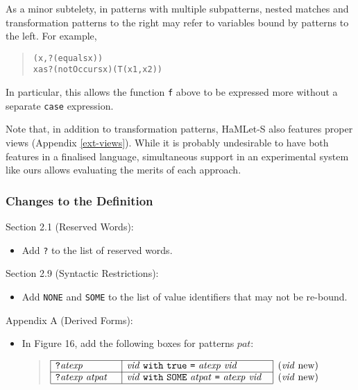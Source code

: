 \documentclass[twoside,titlepage]{article}
\begin{document}
\begin{appendix}
As a minor subtelety, in patterns with multiple subpatterns, nested matches and transformation patterns to the right may refer to variables bound by patterns to the left. For example,
\begin{quote}
\begin{alltt}
(x, ?(equals x))
x as ?(notOccurs x)(T(x1,x2))
\end{alltt}
\end{quote}
In particular, this allows the function {\tt f} above to be expressed more without a separate {\tt case} expression.

Note that, in addition to transformation patterns, HaMLet-S also features proper views (Appendix \ref{ext-views}). While it is probably undesirable to have both features in a finalised language, simultaneous support in an experimental system like ours allows evaluating the merits of each approach.

\subsubsection*{Changes to the Definition}

Section 2.1 (Reserved Words):
\begin{itemize}
\item Add {\tt?} to the list of reserved words.
\end{itemize}

Section 2.9 (Syntactic Restrictions):
\begin{itemize}
\item Add {\tt NONE} and {\tt SOME} to the list of value identifiers that may not be re-bound.
\end{itemize}

Appendix A (Derived Forms):
\begin{itemize}
\item In Figure 16, add the following boxes for patterns $\mathit{pat}$:
  \begin{quote}
  $\begin{array}{|l|l|l}
  \cline{1-2}
  \mbox{\tt?}\mathit{atexp}~~~~\strut
  & \mathit{vid}~{\tt{with}}~{\tt{true}}~\mbox{\tt=}~\mathit{atexp}~\mathit{vid}
  & \mbox{($\mathit{vid}$ new)} \\
  \cline{1-2}
  \mbox{\tt?}\mathit{atexp}~\mathit{atpat}~~~\strut
  & \mathit{vid}~{\tt{with}}~{\tt{SOME}}~\mathit{atpat}~\mbox{\tt=}~\mathit{atexp}~\mathit{vid}~~
  & \mbox{($\mathit{vid}$ new)} \\
  \cline{1-2}
  \end{array}$
  \end{quote}
\end{itemize}


\end{appendix}
\end{document}
